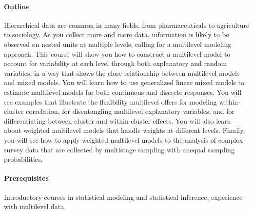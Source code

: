 \documentclass[11pt]{article}
\begin{document}
\paragraph{Outline}
Hierarchical data are common in many fields, from pharmaceuticals to
agriculture to sociology. As you collect more and more data,
information is likely to be observed on nested units at multiple
levels, calling for a multilevel modeling approach. This course will
show you how to construct a multilevel model to account for
variability at each level through both explanatory and random
variables, in a way that shows the close relationship between
multilevel models and mixed models. You will learn how to use
generalized linear mixed models to estimate multilevel models for both
continuous and discrete responses. You will see examples that
illustrate the flexibility multilevel offers for modeling
within-cluster correlation, for disentangling multilevel explanatory
variables, and for differentiating between-cluster and within-cluster
effects. You will also learn about weighted multilevel models that
handle weights at different levels. Finally, you will see how to apply
weighted multilevel models to the analysis of complex survey data that
are collected by multistage sampling with unequal sampling
probabilities.

\paragraph{Prerequisites}
Introductory courses in statistical modeling and
statistical inference; experience with multilevel data.
\end{document}
